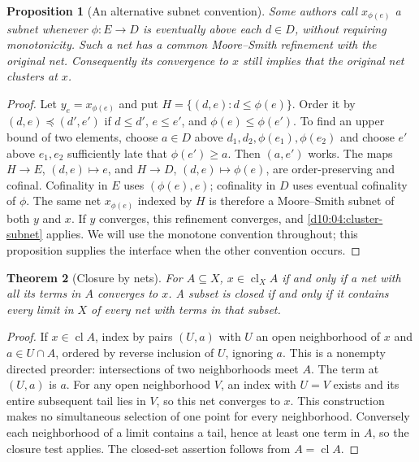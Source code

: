\documentclass[11pt,oneside,openany]{book}
\newtheorem{theorem}{Theorem}[chapter]
\newtheorem{proposition}[theorem]{Proposition}
\theoremstyle{definition}
\theoremstyle{remark}
\DeclareMathOperator{\cl}{cl}
\begin{document}
\begin{proposition}[An alternative subnet convention]\label{d10:04:subnet-interface}
Some authors call $x_{\phi(e)}$ a subnet whenever $\phi:E\to D$ is eventually above each $d\in D$, without requiring monotonicity. Such a net has a common Moore--Smith refinement with the original net. Consequently its convergence to $x$ still implies that the original net clusters at $x$.
\end{proposition}
\begin{proof}
Let $y_e=x_{\phi(e)}$ and put $H=\{(d,e):d\le\phi(e)\}$. Order it by $(d,e)\preceq(d',e')$ if $d\le d'$, $e\le e'$, and $\phi(e)\le\phi(e')$. To find an upper bound of two elements, choose $a\in D$ above $d_1,d_2,\phi(e_1),\phi(e_2)$ and choose $e'$ above $e_1,e_2$ sufficiently late that $\phi(e')\ge a$. Then $(a,e')$ works. The maps $H\to E$, $(d,e)\mapsto e$, and $H\to D$, $(d,e)\mapsto\phi(e)$, are order-preserving and cofinal. Cofinality in $E$ uses $(\phi(e),e)$; cofinality in $D$ uses eventual cofinality of $\phi$. The same net $x_{\phi(e)}$ indexed by $H$ is therefore a Moore--Smith subnet of both $y$ and $x$. If $y$ converges, this refinement converges, and \cref{d10:04:cluster-subnet} applies. We will use the monotone convention throughout; this proposition supplies the interface when the other convention occurs.
\end{proof}

\begin{theorem}[Closure by nets]\label{d10:04:closure-net}
For $A\subseteq X$, $x\in\cl_X A$ if and only if a net with all its terms in $A$ converges to $x$. A subset is closed if and only if it contains every limit in $X$ of every net with terms in that subset.
\end{theorem}
\begin{proof}
If $x\in\cl A$, index by pairs $(U,a)$ with $U$ an open neighborhood of $x$ and $a\in U\cap A$, ordered by reverse inclusion of $U$, ignoring $a$. This is a nonempty directed preorder: intersections of two neighborhoods meet $A$. The term at $(U,a)$ is $a$. For any open neighborhood $V$, an index with $U=V$ exists and its entire subsequent tail lies in $V$, so this net converges to $x$. This construction makes no simultaneous selection of one point for every neighborhood. Conversely each neighborhood of a limit contains a tail, hence at least one term in $A$, so the closure test applies. The closed-set assertion follows from $A=\cl A$.
\end{proof}
\end{document}
